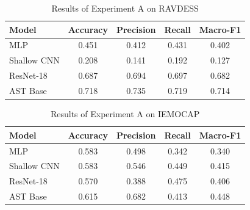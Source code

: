 \begin{table}[htbp]
    \centering
    \caption{ Results of Experiment A on RAVDESS}
    \label{tab:ravdess_results}
    \begin{tabular}{lcccc}
        \hline
        Model & Accuracy & Precision & Recall & Macro-F1 \\
        \hline
        MLP & 0.451 & 0.412 & 0.431 & 0.402 \\
        Shallow CNN & 0.208 & 0.141 & 0.192 & 0.127 \\
        ResNet-18 & 0.687 & 0.694 & 0.697 & 0.682 \\
        AST Base &  0.718 &  0.735 & 0.719 & 0.714 \\
        \hline
    \end{tabular}
\end{table}



\begin{table}[htbp]
    \centering
    \caption{ Results of Experiment A on IEMOCAP}
    \label{tab:iemocap_results}
    \begin{tabular}{lcccc}
        \hline
        Model & Accuracy & Precision & Recall & Macro-F1 \\
        \hline
        MLP & 0.583 & 0.498 & 0.342 & 0.340 \\
        Shallow CNN & 0.583 & 0.546 & 0.449 & 0.415 \\
        ResNet-18 & 0.570 & 0.388 & 0.475 & 0.406 \\
        AST Base & 0.615 & 0.682 & 0.413 &  0.448\\

        \hline
    \end{tabular}
\end{table}


